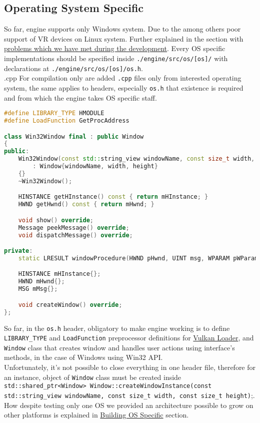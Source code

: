 \newpage

\subsection{Operating System Specific}
\label{sec:os}

So far, engine supports only Windows system. Due to the among others poor support of VR devices on Linux system.
Further explained in the section with \hyperref[sec:problems]{problems which we have met during the development}.
Every OS specific implementations should be specified inside \texttt{./engine/src/os/[os]/} with declarations at \texttt{./engine/src/os/[os]/os.h}.\\.cpp
For compilation only are added \texttt{.cpp} files only from interested operating system, the same applies to headers, especially \texttt{os.h} that existence is required and from which the engine takes OS specific staff.
\begin{lstlisting}[language=c++, caption=Windows OS Header(./engine/src/os/win32/os.h)]
#define LIBRARY_TYPE HMODULE
#define LoadFunction GetProcAddress

class Win32Window final : public Window
{
public:
    Win32Window(const std::string_view windowName, const size_t width, const size_t height)
        : Window{windowName, width, height}
    {}
    ~Win32Window();

    HINSTANCE getHInstance() const { return mHInstance; }
    HWND getHwnd() const { return mHwnd; }

    void show() override;
    Message peekMessage() override;
    void dispatchMessage() override;

private:
    static LRESULT windowProcedure(HWND pHwnd, UINT msg, WPARAM pWParam, LPARAM wLParam);

    HINSTANCE mHInstance{};
    HWND mHwnd{};
    MSG mMsg{};

    void createWindow() override;
};
\end{lstlisting}

So far, in the \texttt{os.h} header, obligatory to make engine working is to define \texttt{LIBRARY\_TYPE} and \texttt{LoadFunction} preprocessor definitions for \hyperref[sec:vkLoader]{Vulkan Loader}, and \texttt{Window} class that creates window and handles user actions using interface's methods, in the case of Windows using Win32 API.\\
Unfortunately, it's not possible to close everything in one header file, therefore for an instance, object of \texttt{Window} class must be created inside \texttt{std::shared\_ptr<Window> Window::createWindowInstance(const std::string\_view windowName, const size\_t width, const size\_t height)};.
How despite testing only one OS we provided an architecture possible to grow on other platforms is explained in
\hyperref[sec:build_specfic]{Building OS Specific} section.